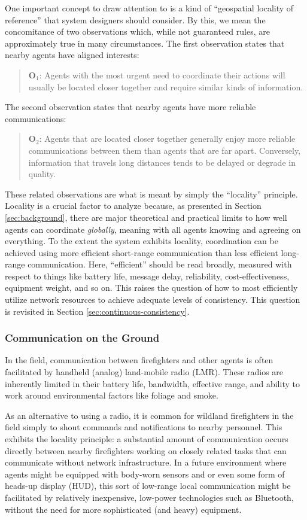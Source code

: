 \documentclass[]             %
{NASA}                       %
\theoremstyle{definition}
\begin{document}
One important concept to draw attention to is a kind of ``geospatial
locality of reference'' that system designers should consider. By
this, we mean the concomitance of two observations which, while not
guaranteed rules, are approximately true in many circumstances. The
first observation states that nearby agents have aligned interests:
\begin{quote}
  $\textbf{O}_1$: Agents with the most urgent need to coordinate their
  actions will usually be located closer together and require similar
  kinds of information.
\end{quote}
The second observation states that nearby agents have more reliable
communications:
\begin{quote}
  $\textbf{O}_2$: Agents that are located closer together generally
  enjoy more reliable communications between them than agents that are
  far apart. Conversely, information that travels long distances tends to
  be delayed or degrade in quality.
\end{quote}

These related observations are what is meant by simply the
``locality'' principle. Locality is a crucial factor to analyze
because, as presented in Section \ref{sec:background}, there are major
theoretical and practical limits to how well agents can coordinate
\emph{globally}, meaning with all agents knowing and agreeing on
everything. To the extent the system exhibits locality, coordination
can be achieved using more efficient short-range communication than
less efficient long-range communication. Here, ``efficient'' should be
read broadly, measured with respect to things like battery life,
message delay, reliability, cost-effectiveness, equipment weight, and
so on. This raises the question of how to most efficiently utilize
network resources to achieve adequate levels of consistency. This
question is revisited in Section \ref{sec:continuous-consistency}.

\subsubsection{Communication on the Ground}
\label{sssec:ground-communication}
In the field, communication between firefighters and other agents is
often facilitated by handheld (analog) land-mobile radio (LMR). These
radios are inherently limited in their battery life, bandwidth,
effective range, and ability to work around environmental factors like
foliage and smoke.

As an alternative to using a radio, it is common for wildland
firefighters in the field simply to shout commands and notifications
to nearby personnel. This exhibits the locality principle: a
substantial amount of communication occurs directly between nearby
firefighters working on closely related tasks that can communicate
without network infrastructure. In a future environment where agents
might be equipped with body-worn sensors and or even some form of
heads-up display (HUD), this sort of low-range local communication
might be facilitated by relatively inexpensive, low-power technologies
such as Bluetooth, without the need for more sophisticated (and heavy)
equipment.
\end{document}
